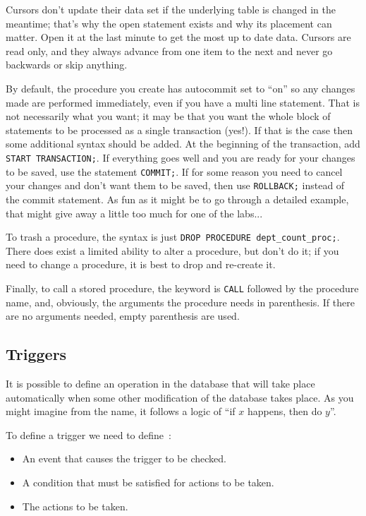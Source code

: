Cursors don't update their data set if the underlying table is changed in the meantime; that's why the open statement exists and why its placement can matter. Open it at the last minute to get the most up to date data. Cursors are read only, and they always advance from one item to the next and never go backwards or skip anything.

By default, the procedure you create has autocommit set to ``on'' so any changes made are performed immediately, even if you have a multi line statement. That is not necessarily what you want; it may be that you want the whole block of statements to be processed as a single transaction (yes!). If that is the case then some additional syntax should be added. At the beginning of the transaction, add \texttt{START TRANSACTION;}. If everything goes well and you are ready for your changes to be saved, use the statement \texttt{COMMIT;}. If for some reason you need to cancel your changes and don't want them to be saved, then use \texttt{ROLLBACK;} instead of the commit statement. As fun as it might be to go through a detailed example, that might give away a little too much for one of the labs...

To trash a procedure, the syntax is just \texttt{DROP PROCEDURE dept\_count\_proc;}. There does exist a limited ability to alter a procedure, but don't do it; if you need to change a procedure, it is best to drop and re-create it.

Finally, to call a stored procedure, the keyword is \texttt{CALL} followed by the procedure name, and, obviously, the arguments the procedure needs in parenthesis. If there are no arguments needed, empty parenthesis are used.

\subsection*{Triggers}

It is possible to define an operation in the database that will take place automatically when some other modification of the database takes place. As you might imagine from the name, it follows a logic of ``if $x$ happens, then do $y$''. 

To define a trigger we need to define~\cite{dsc}:
\begin{itemize}
	\item An event that causes the trigger to be checked.
	\item A condition that must be satisfied for actions to be taken.
	\item The actions to be taken.
\end{itemize}

